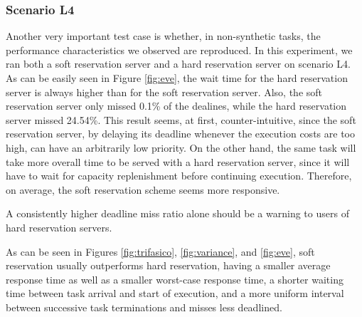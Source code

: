 \documentclass[times, 10pt,twocolumn]{article}
\begin{document}
\subsubsection{Scenario L4}
\label{sec:scenario-l4}

Another very important test case is whether, in non-synthetic tasks,
the performance characteristics we observed are reproduced. In this
experiment, we ran both a soft reservation server and a hard
reservation server on scenario L4. As can be easily seen in Figure
\ref{fig:eve}, the wait time for the hard reservation server is always
higher than for the soft reservation server. Also, the soft
reservation server only missed 0.1\% of the dealines, while the hard
reservation server missed 24.54\%. This result seems, at first,
counter-intuitive, since the soft reservation server, by delaying its
deadline whenever the execution costs are too high, can have an
arbitrarily low priority. On the other hand, the same task will take
more overall time to be served with a hard reservation server, since
it will have to wait for capacity replenishment before continuing
execution. Therefore, on average, the soft reservation scheme seems
more responsive.

\label{sec:conclusion}

A consistently higher deadline miss ratio alone should be a warning to
users of hard reservation servers.

As can be seen in Figures \ref{fig:trifasico}, \ref{fig:variance}, and
\ref{fig:eve}, soft reservation usually outperforms hard reservation,
having a smaller average response time as well as a smaller worst-case
response time, a shorter waiting time between task arrival and start
of execution, and a more uniform interval between successive task
terminations and misses less deadlined.



\end{document}
